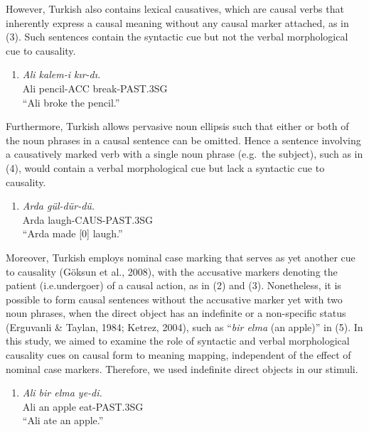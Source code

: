 \documentclass[man]{apa6}
\providecommand{\tightlist}{%
  \setlength{\itemsep}{0pt}\setlength{\parskip}{0pt}}
\begin{document}
However, Turkish also contains lexical causatives, which are causal
verbs that inherently express a causal meaning without any causal marker
attached, as in (3). Such sentences contain the syntactic cue but
not the verbal morphological cue to causality.

\begin{enumerate}
\def\labelenumi{(\arabic{enumi})}
\setcounter{enumi}{2}
\tightlist
\item
  \emph{Ali kalem-i kır-dı.}\\
  Ali pencil-ACC break-PAST.3SG\\
  \enquote{Ali broke the pencil.}
\end{enumerate}

Furthermore, Turkish allows pervasive noun ellipsis such that either or
both of the noun phrases in a causal sentence can be omitted. Hence a
sentence involving a causatively marked verb with a single noun phrase
(e.g.~the subject), such as in (4), would contain a verbal morphological
cue but lack a syntactic cue to causality.

\begin{enumerate}
\def\labelenumi{(\arabic{enumi})}
\setcounter{enumi}{3}
\tightlist
\item
  \emph{Arda gül-dür-dü.}\\
  Arda laugh-CAUS-PAST.3SG\\
  \enquote{Arda made {[}0{]} laugh.}
\end{enumerate}

Moreover, Turkish employs nominal case marking that serves as yet
another cue to causality (Göksun et al., 2008), with the accusative
markers denoting the patient (i.e.undergoer) of a causal action, as in
(2) and (3). Nonetheless, it is possible to form causal sentences
without the accusative marker yet with two noun phrases, when the direct
object has an indefinite or a non-specific status (Erguvanli \& Taylan,
1984; Ketrez, 2004), such as \enquote{\emph{bir elma} (an apple)} in
(5). In this study, we aimed to examine the role of syntactic and verbal
morphological causality cues on causal form to meaning mapping,
independent of the effect of nominal case markers. Therefore, we used
indefinite direct objects in our stimuli.

\begin{enumerate}
\def\labelenumi{(\arabic{enumi})}
\setcounter{enumi}{4}
\tightlist
\item
  \emph{Ali bir elma ye-di.}\\
  Ali an apple eat-PAST.3SG\\
  \enquote{Ali ate an apple.}
\end{enumerate}
\end{document}

